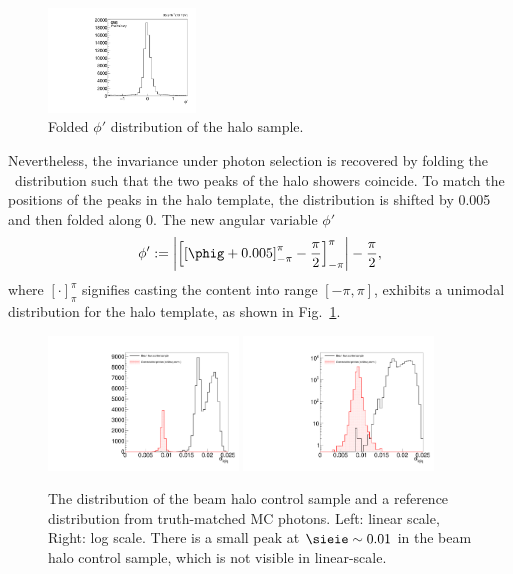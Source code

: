 \begin{figure}[tbp]
  \begin{center}
    \includegraphics[width=0.35\textwidth]{Reconstruction/Figures/halo/haloPhiFolded.pdf}
    \caption{
      Folded $\phi'$ distribution of the halo sample.
    }
    \label{fig:halo_template}
  \end{center}
\end{figure}

Nevertheless, the invariance under photon selection is recovered by folding the \phig\ distribution such that the two peaks of the halo showers coincide.
To match the positions of the peaks in the halo template, the distribution is shifted by 0.005 and then folded along 0. 
The new angular variable $\phi'$
\begin{equation}
  \phi' := \left|\left[\left[\phig + 0.005\right]_{-\pi}^{\pi} - \frac{\pi}{2}\right]_{-\pi}^{\pi}\right| - \frac{\pi}{2},
  \label{eqn:phi}
\end{equation}
where $[\cdot]_{\pi}^{\pi}$ signifies casting the content into range $[-\pi,\pi]$,
exhibits a unimodal distribution for the halo template, as shown in Fig.~\ref{fig:halo_template}.

\begin{figure}[tbp]
  \begin{center}
    \includegraphics[width=0.45\textwidth]{Reconstruction/Figures/halo/halo_sieie.pdf}
    \includegraphics[width=0.45\textwidth]{Reconstruction/Figures/halo/halo_sieie_log.pdf}
    \caption{
      The \sieie distribution of the beam halo control sample and a reference distribution from truth-matched MC photons. 
      Left: linear scale, Right: log scale. 
      There is a small peak at $\sieie \sim 0.01$ in the beam halo control sample, which is not visible in linear-scale.
    }
    \label{fig:halo_sieie}
  \end{center}
\end{figure}

